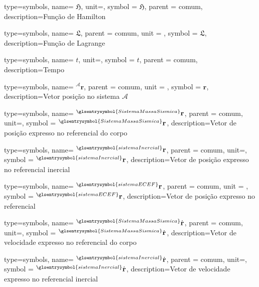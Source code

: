 {type=symbols,
  name= \ensuremath{\mathfrak{H}},
  unit={},
  symbol = \ensuremath{\mathfrak{H}},
  parent = comum,
  description={Função de Hamilton}
}

{type=symbols,
  name= \ensuremath{\mathfrak{L}},
  parent = {comum},
  unit = {\unexpanded{\si{\joule}}},
  symbol = \ensuremath{\mathfrak{L}},
  description={Função de Lagrange}
}

{type=symbols,
  name= \ensuremath{t},
  unit=\unexpanded{\si{\second}},
  symbol = \ensuremath{t},
  parent = comum,
  description={Tempo}
}

{type=symbols,
  name= \ensuremath{{}^{\mathcal{A}}\mathbf{r}},
  parent = {comum},
  unit = \unexpanded{\si{\meter}},
  symbol = \ensuremath{\mathbf{r}},
  description={Vetor posição no sistema \ensuremath{\mathcal{A}}}
}

{type=symbols,
  name= \ensuremath{{}^{\glsentrysymbol{SistemaMassaSismica}}\mathbf{r}},
  parent = {comum},
  unit=\unexpanded{\si{\meter}},
  symbol = \ensuremath{{}^{\glsentrysymbol{SistemaMassaSismica}}\mathbf{r}},
  description={Vetor de posição expresso no referencial do corpo}
}

{type=symbols,
  name= \ensuremath{{}^{\glsentrysymbol{sistemaInercial}}\mathbf{r}},
  parent = {comum},
  unit=\unexpanded{\metre},
  symbol = \ensuremath{{}^{\glsentrysymbol{sistemaInercial}}\mathbf{r}},
  description={Vetor de posição expresso no referencial inercial}
}

{type=symbols,
  name= \ensuremath{{}^{\glsentrysymbol{sistemaECEF}}\mathbf{r}},
  parent = {comum},
  unit = \unexpanded{},
  symbol = \ensuremath{{}^{\glsentrysymbol{sistemaECEF}}\mathbf{r}},
  description={Vetor de posição expresso no referencial }
}

{type=symbols,
  name= \ensuremath{{}^{\glsentrysymbol{SistemaMassaSismica}}\dot{\mathbf{r}}},
  parent = {comum},
  unit=\unexpanded{\metre\per\second},
  symbol = \ensuremath{{}^{\glsentrysymbol{SistemaMassaSismica}}\dot{\mathbf{r}}},
  description={Vetor de velocidade expresso no referencial do corpo}
}

{type=symbols,
  name= \ensuremath{{}^{\glsentrysymbol{sistemaInercial}}\dot{\mathbf{r}}},
  parent = {comum},
  unit=\unexpanded{\metre\per\second},
  symbol = \ensuremath{{}^{\glsentrysymbol{sistemaInercial}}\dot{\mathbf{r}}},
  description={Vetor de velocidade expresso no referencial inercial}
}

